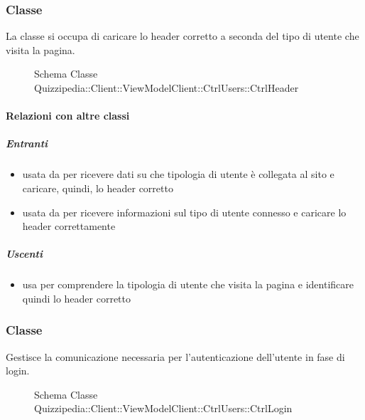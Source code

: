 \subsubsection{Classe }
La classe si occupa di caricare lo header corretto a seconda del tipo di utente che visita la pagina.
\begin{figure}[H]
\centering
\noindent{}
\caption[Schema Classe CtrlHeader]{Schema Classe Quizzipedia::Client::ViewModelClient::CtrlUsers::CtrlHeader}
\end{figure}
\paragraph{Relazioni con altre classi}
\subparagraph{Entranti}
\begin{itemize}
\item usata da  per ricevere dati su che tipologia di utente è collegata al sito e caricare, quindi, lo header corretto
\item usata da  per ricevere informazioni sul tipo di utente connesso e caricare lo header correttamente
\end{itemize}
\subparagraph{Uscenti}
\begin{itemize}
\item usa  per comprendere la tipologia di utente che visita la pagina e identificare quindi lo header corretto
\end{itemize}
\subsubsection{Classe }
Gestisce la comunicazione necessaria per l'autenticazione dell'utente in fase di login.
\begin{figure}[H]
\centering
\noindent{}
\caption[Schema Classe CtrlLogin]{Schema Classe Quizzipedia::Client::ViewModelClient::CtrlUsers::CtrlLogin}
\end{figure}
